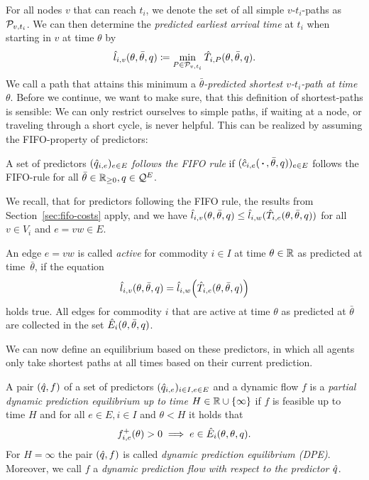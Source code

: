 For all nodes $v$ that can reach $t_i$, we denote the set of all simple $v$-$t_i$-paths as $\mathcal{P}_{v,t_i}$.
We can then determine the \emph{predicted earliest arrival time} at $t_i$ when starting in $v$ at time $\theta$ by
\[
    \hat l_{i,v}(\theta, \bar\theta, q) \coloneqq \min_{P \in \mathcal{P}_{v,t_i}} \hat T_{i, P}(\theta,\bar\theta, q).
\]
We call a path that attains this minimum a \emph{$\bar\theta$-predicted shortest $v$-$t_i$-path at time $\theta$}.
Before we continue, we want to make sure, that this definition of shortest-paths is sensible:
We can only restrict ourselves to simple paths, if waiting at a node, or traveling through a short cycle, is never helpful.
This can be realized by assuming the FIFO-property of predictors:
\begin{definition}
    A set of predictors $(\hat q_{i,e})_{e\in E}$ \emph{follows the FIFO rule} if $(\hat c_{i,e}(\,\boldsymbol{\cdot}\,, \bar\theta, q))_{e\in E}$ follows the FIFO-rule for all $\bar\theta\in\mathbb{R}_{\geq0}, q\in\mathcal{Q}^E$.
\end{definition}

We recall, that for predictors following the FIFO rule, the results from Section~\ref{sec:fifo-costs} apply, and we have $\hat l_{i,v}(\theta, \bar\theta, q) \leq \hat l_{i,w}{(
    \hat T_{i, e}(\theta, \bar\theta, q)
)}$
for all $v\in V_i$ and $e=vw\in E$.

\begin{definition}
An edge $e=vw$ is called \emph{active} for commodity $i\in I$ at time $\theta\in\mathbb{R}$ as predicted at time~$\bar\theta$, if the equation \[
    \hat l_{i,v}(\theta, \bar\theta, q) = \hat l_{i,w}{\left(
        \hat T_{i, e}(\theta, \bar\theta, q)
    \right)}
\]
holds true.
All edges for commodity $i$ that are active at time $\theta$ as predicted at $\bar\theta$ are collected in the set $\hat E_i(\theta, \bar\theta, q)$. 
\end{definition}

We can now define an equilibrium based on these predictors, in which all agents only take shortest paths at all times based on their current prediction.
\begin{definition}
    A pair $(\hat q, f)$ of a set of predictors $(\hat q_{i,e})_{i\in I, e\in E}$ and a dynamic flow $f$ is a \emph{partial dynamic prediction equilibrium up to time $H\in\mathbb{R}\cup\{\infty\}$} if $f$ is feasible up to time $H$ and for all $e\in E, i\in I$ and $\theta < H$ it holds that
    \[
        {f}^+_{i,e}(\theta) > 0 \implies e \in \hat E_i(\theta, \theta, q).
    \]
    For $H = \infty$ the pair $(\hat q, f)$ is called \emph{dynamic prediction equilibrium (DPE)}. 
    Moreover, we call $f$ a \emph{dynamic prediction flow with respect to the predictor $\hat q$}. 

\end{definition}

